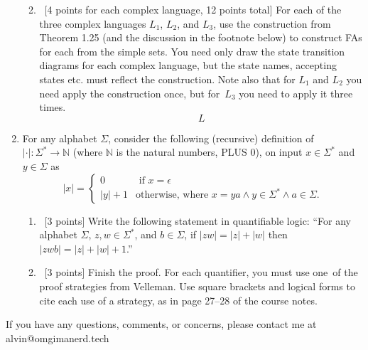 \documentclass[letterpaper, 12pt]{math}
\begin{document}
\begin{enumerate}
\begin{enumerate}
\begin{center}
    \end{center}
    \item~[4 points for each complex language, 12 points total] For each of the
    three complex languages \( L_1 \), \( L_2 \), and \( L_3 \), use the
    construction from Theorem 1.25 (and the discussion in the footnote below)
    to construct FAs for each from the simple sets. You need only draw the
    state transition diagrams for each complex language, but the state names,
    accepting states etc. must reflect the construction. Note also that for
    \( L_1 \) and \( L_2 \) you need apply the construction once, but for\
    \( L_3 \) you need to apply it three times.
    \[ L \]
  \end{enumerate}
  \item For any alphabet \( \Sigma \), consider the following (recursive)
  definition of \( |\cdot|: \Sigma^* \rightarrow \mathbb{N}\) (where
  \( \mathbb{N} \) is the natural numbers, PLUS \( 0 \)), on input \(x \in
  \Sigma^*\) and \(y \in \Sigma\) as
  \[ |x| = \left\{\begin{array}{ll} 0 & \mbox{ if } x = \epsilon \\
    |y| + 1 & \mbox{otherwise, where } x=ya \wedge y \in \Sigma^* \wedge a \in
    \Sigma.\end{array}\right. \]
  \begin{enumerate}
    \item ~[3 points] Write the following statement in quantifiable logic:
    ``For any alphabet \( \Sigma \), \( z,w\in\Sigma^* \), and \( b\in\Sigma
      \), if \( |zw| = |z| + |w| \) then \( |zwb| = |z| + |w| + 1 \).''
    \item ~[3 points] Finish the proof. For each quantifier, you must use one\
    of the proof strategies from Velleman. Use square brackets and logical
    forms to cite each use of a strategy, as in page 27--28 of the course notes.
  \end{enumerate}
\end{enumerate}

\begin{center}
  If you have any questions, comments, or concerns, please contact me at
  alvin@omgimanerd.tech
\end{center}
\end{document}

